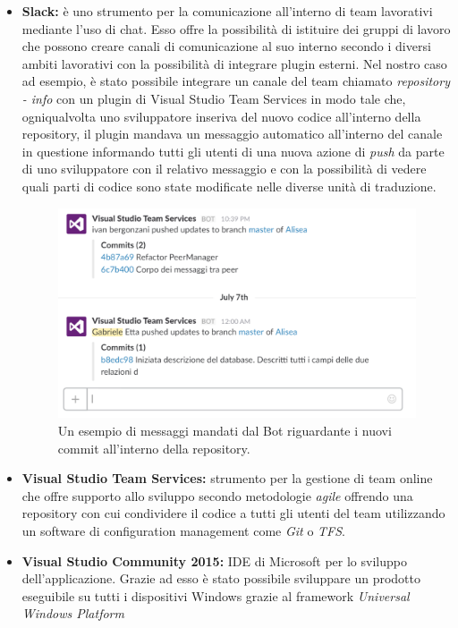 \documentclass[a4]{book}
\begin{document}
\begin{itemize}
	\item \textbf{Slack: }è uno strumento per la comunicazione all'interno di team lavorativi mediante l'uso di chat. Esso offre la possibilità di istituire dei gruppi di lavoro che possono creare canali di comunicazione al suo interno secondo i diversi ambiti lavorativi con la possibilità di integrare plugin esterni. Nel nostro caso ad esempio, è stato possibile integrare un canale del team chiamato \textit{repository - info} con un plugin di Visual Studio Team Services in modo tale che, ogniqualvolta uno sviluppatore inseriva del nuovo codice all'interno della repository, il plugin mandava un messaggio automatico all'interno del canale in questione informando tutti gli utenti di una nuova azione di \textit{push} da parte di uno sviluppatore con il relativo messaggio e con la possibilità di vedere quali parti di codice sono state modificate nelle diverse unità di traduzione.
	
	\begin{figure}[!h]
		\centering
		\caption{Un esempio di messaggi mandati dal Bot riguardante i nuovi commit all'interno della repository.}
		\includegraphics[scale=0.5]{slack}
		\medskip
		\small
	\end{figure}
	
	\item \textbf{Visual Studio Team Services:} strumento per la gestione di team online che offre supporto allo sviluppo secondo metodologie \textit{agile} offrendo una repository con cui condividere il codice a tutti gli utenti del team utilizzando un software di configuration management come \textit{Git} o \textit{TFS}.
	
	\item \textbf{Visual Studio Community 2015:} IDE di Microsoft per lo sviluppo dell'applicazione. Grazie ad esso è stato possibile sviluppare un prodotto eseguibile su tutti i dispositivi Windows grazie al framework \textit{Universal Windows Platform}
	

\end{itemize}
\end{document}
